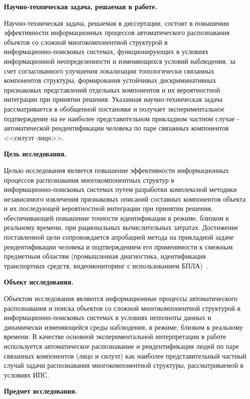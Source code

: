 \textbf{Научно‑техническая задача, решаемая в работе.}

Научно‑техническая задача, решаемая в диссертации, состоит в повышении
эффективности информационных процессов автоматического распознавания
объектов со сложной многокомпонентной структурой в информационно‑поисковых
системах, функционирующих в условиях информационной неопределенности и
изменяющихся условий наблюдения, за счет согласованного улучшения
локализации топологически связанных компонентов структуры, формирования
устойчивых дискриминативных признаковых представлений отдельных
компонентов и их вероятностной интеграции при принятии решения. Указанная
научно‑техническая задача рассматривается в обобщенной постановке и
получает экспериментальное подтверждение на ее наиболее представительном
прикладном частном случае - автоматической реидентификации человека по
паре связанных компонентов <<силуэт--лицо>>.

\textbf{Цель исследования.}

Целью исследования является повышение эффективности информационных
процессов распознавания многокомпонентных структур в информационно‑поисковых
системах путем разработки комплексной методики независимого извлечения
признаковых описаний составных компонентов объекта и их последующей
вероятностной интеграции при принятии решения, обеспечивающей повышение
точности идентификации в режиме, близком к реальному времени, при
рациональных вычислительных затратах. Достижение поставленной цели
сопровождается апробацией метода на прикладной задаче реидентификации
человека и подтверждением его применимости к смежным предметным областям
(промышленная диагностика, идентификация транспортных средств,
видеомониторинг с использованием
БПЛА)~\cite{Rusakov2021corrosion,Rusakov2020license,Rusakov2023uavspeed,Rusakov2024marine}.

\textbf{Объект исследования.}

Объектом исследования являются информационные процессы автоматического
распознавания и поиска объектов со сложной многокомпонентной структурой
в информационно‑поисковых системах в условиях неполноты данных и
динамически изменяющейся среды наблюдения, в режиме, близком к реальному
времени. В качестве основной экспериментальной интерпретации в работе
используется автоматическое распознавание и реидентификация людей по
паре связанных компонентов (лицо и силуэт) как наиболее представительный
частный случай задачи распознавания многокомпонентной структуры,
рассматриваемой в условиях ИПС.

\textbf{Предмет исследования.}

